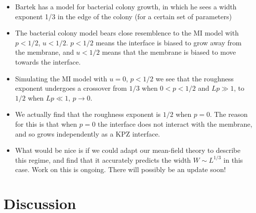 \documentclass[a4paper,10pt]{article}
\begin{document}
\begin{itemize}
 \item Bartek has a model for bacterial colony growth, in which he sees a width exponent 1/3 in the edge of the colony (for a certain set of parameters)
 \item The bacterial colony model bears close resemblence to the MI model with $p < 1/2$, $u<1/2$. $p < 1/2$ means the interface is biased to grow away from the membrane, and $u < 1/2$ means that the membrane is biased to move towards the interface.
 \item Simulating the MI model with $u=0$, $p < 1/2$ we see that the roughness exponent undergoes a crossover from $1/3$ when $0 < p < 1/2$ and $Lp\gg 1$, to $1/2$ when $Lp \ll 1$, $p \to 0$.
 \item We actually find that the roughness exponent is $1/2$ when $p=0$. The reason for this is that when $p=0$ the interface does not interact with the membrane, and so grows independently as a KPZ interface.
 \item What would be nice is if we could adapt our mean-field theory to describe this regime, and find that it accurately predicts the width $W \sim L^{1/3}$ in this case. Work on this is ongoing. There will possibly be an update soon!
\end{itemize}
 


\newpage%
\section{Discussion}\label{sec:discussion}
\end{document}
